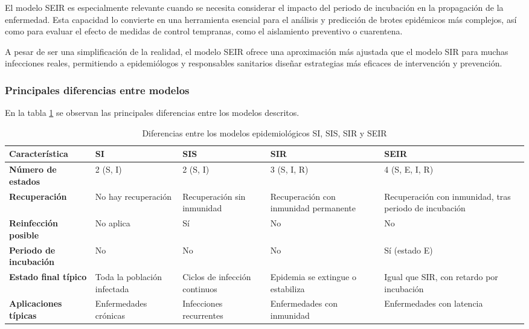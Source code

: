 El modelo SEIR es especialmente relevante cuando se necesita considerar el impacto del periodo de incubación en la propagación de la enfermedad. Esta capacidad lo convierte en una herramienta esencial para el análisis y predicción de brotes epidémicos más complejos, así como para evaluar el efecto de medidas de control tempranas, como el aislamiento preventivo o cuarentena.

A pesar de ser una simplificación de la realidad, el modelo SEIR ofrece una aproximación más ajustada que el modelo SIR para muchas infecciones reales, permitiendo a epidemiólogos y responsables sanitarios diseñar estrategias más eficaces de intervención y prevención.

\subsubsection*{Principales diferencias entre modelos}
En la tabla \ref{tab:diferencias_modelos} se observan las principales diferencias entre los modelos descritos.
\begin{table}[H]
\centering
\caption{Diferencias entre los modelos epidemiológicos SI, SIS, SIR y SEIR}
\label{tab:diferencias_modelos}
\begin{tabularx}{\textwidth}{|X|X|X|X|X|}
\hline
\textbf{Característica} & \textbf{SI} & \textbf{SIS} & \textbf{SIR} & \textbf{SEIR} \\
\hline
\textbf{Número de estados} & 2 (S, I) & 2 (S, I) & 3 (S, I, R) & 4 (S, E, I, R) \\
\hline
\textbf{Recuperación} & No hay recuperación & Recuperación sin inmunidad & Recuperación con inmunidad permanente & Recuperación con inmunidad, tras periodo de incubación \\
\hline
\textbf{Reinfección posible} & No aplica & Sí & No & No \\
\hline
\textbf{Periodo de incubación} & No & No & No & Sí (estado E) \\
\hline
\textbf{Estado final típico} & Toda la población infectada & Ciclos de infección continuos & Epidemia se extingue o estabiliza & Igual que SIR, con retardo por incubación \\
\hline
\textbf{Aplicaciones típicas} &  Enfermedades crónicas & Infecciones recurrentes & Enfermedades con inmunidad & Enfermedades con latencia \\
\hline
\end{tabularx}
\end{table}



